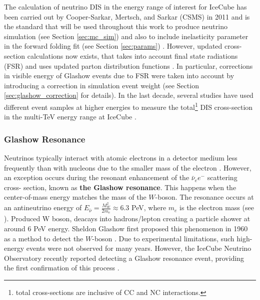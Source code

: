 The calculation of neutrino DIS in the energy range of interest for IceCube has been carried out by Cooper-Sarkar, Mertsch, and Sarkar (CSMS) in 2011 and is the standard that will be used throughout this work to produce neutrino simulation (see Section \ref{sec:mc_sim}) and also to include inelasticity parameter in the forward folding fit (see Section \ref{sec:params}) . However, updated cross-section calculations now exists, that takes into account final state radiations (FSR) \cite{xsec_alfonso} and  uses updated parton distribution functions \cite{CT18}. In particular, corrections in visible energy of Glashow events due to FSR were taken into account by introducing a correction in simulation event weight (see Section \ref{sec:glashow_correction} for details). In the last decade, several studies have used different event samples at higher energies to measure the total\footnote{total cross-sections are inclusive of CC and NC interactions.} DIS cross-section in the multi-TeV energy range at IceCube .

\subsubsection*{Glashow Resonance}
\label{sec:glashow}
Neutrinos typically interact with atomic electrons in a detector medium less frequently than with nucleons due to the smaller mass of the electron . However, an exception occurs during the resonant enhancement of the $\bar{\nu}_e e^-$ scattering cross- section, known as \textbf{the Glashow resonance}. This happens when the center-of-mass energy matches the mass of the $W$-boson. The resonance occurs at an antineutrino energy of $E_{\bar{\nu}} = \frac{M_W^2}{2m_e} \approx 6.3$ PeV, where $m_e$ is the electron mass (see ). Produced W boson, deacays into hadrons/lepton creating a particle shower at around 6 PeV energy. Sheldon Glashow first proposed this phenomenon in 1960 as a method to detect the $W$-boson . Due to experimental limitations, such high-energy events were not observed for many years. However, the IceCube Neutrino Observatory recently reported detecting a Glashow resonance event, providing the first confirmation of this process .

